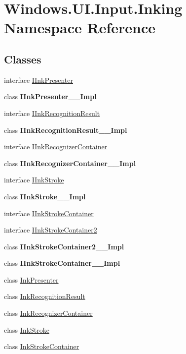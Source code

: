\hypertarget{namespace_windows_1_1_u_i_1_1_input_1_1_inking}{}\section{Windows.\+U\+I.\+Input.\+Inking Namespace Reference}
\label{namespace_windows_1_1_u_i_1_1_input_1_1_inking}
\subsection*{Classes}
\begin{DoxyCompactItemize}
\item 
interface \hyperlink{interface_windows_1_1_u_i_1_1_input_1_1_inking_1_1_i_ink_presenter}{I\+Ink\+Presenter}
\item 
class {\bfseries I\+Ink\+Presenter\+\_\+\+\_\+\+Impl}
\item 
interface \hyperlink{interface_windows_1_1_u_i_1_1_input_1_1_inking_1_1_i_ink_recognition_result}{I\+Ink\+Recognition\+Result}
\item 
class {\bfseries I\+Ink\+Recognition\+Result\+\_\+\+\_\+\+Impl}
\item 
interface \hyperlink{interface_windows_1_1_u_i_1_1_input_1_1_inking_1_1_i_ink_recognizer_container}{I\+Ink\+Recognizer\+Container}
\item 
class {\bfseries I\+Ink\+Recognizer\+Container\+\_\+\+\_\+\+Impl}
\item 
interface \hyperlink{interface_windows_1_1_u_i_1_1_input_1_1_inking_1_1_i_ink_stroke}{I\+Ink\+Stroke}
\item 
class {\bfseries I\+Ink\+Stroke\+\_\+\+\_\+\+Impl}
\item 
interface \hyperlink{interface_windows_1_1_u_i_1_1_input_1_1_inking_1_1_i_ink_stroke_container}{I\+Ink\+Stroke\+Container}
\item 
interface \hyperlink{interface_windows_1_1_u_i_1_1_input_1_1_inking_1_1_i_ink_stroke_container2}{I\+Ink\+Stroke\+Container2}
\item 
class {\bfseries I\+Ink\+Stroke\+Container2\+\_\+\+\_\+\+Impl}
\item 
class {\bfseries I\+Ink\+Stroke\+Container\+\_\+\+\_\+\+Impl}
\item 
class \hyperlink{class_windows_1_1_u_i_1_1_input_1_1_inking_1_1_ink_presenter}{Ink\+Presenter}
\item 
class \hyperlink{class_windows_1_1_u_i_1_1_input_1_1_inking_1_1_ink_recognition_result}{Ink\+Recognition\+Result}
\item 
class \hyperlink{class_windows_1_1_u_i_1_1_input_1_1_inking_1_1_ink_recognizer_container}{Ink\+Recognizer\+Container}
\item 
class \hyperlink{class_windows_1_1_u_i_1_1_input_1_1_inking_1_1_ink_stroke}{Ink\+Stroke}
\item 
class \hyperlink{class_windows_1_1_u_i_1_1_input_1_1_inking_1_1_ink_stroke_container}{Ink\+Stroke\+Container}
\end{DoxyCompactItemize}
